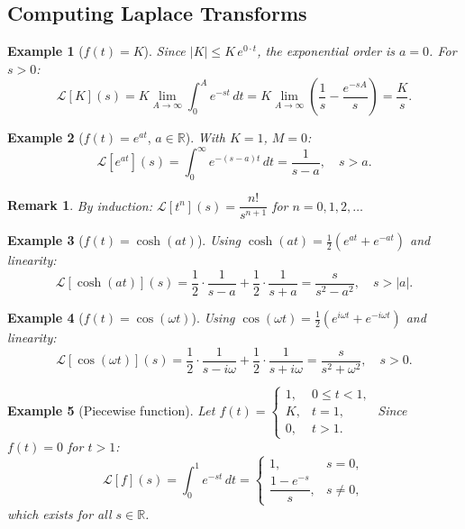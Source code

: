 \documentclass{article}
\newtheorem*{example}{Example}
\newtheorem{remark}{Remark}
\newcommand{\Lap}{\mathcal{L}}
\newcommand{\R}{\mathbb{R}}
\begin{document}
\subsection{Computing Laplace Transforms}

\begin{example}[$f(t) = K$]
    Since $|K| \leq K\,e^{0\cdot t}$, the exponential order is $a = 0$. For $s > 0$:
    \[\Lap[K](s) = K\lim_{A\to\infty}\int_0^A e^{-st}\,dt = K\lim_{A\to\infty}\left(\frac{1}{s} - \frac{e^{-sA}}{s}\right) = \frac{K}{s}.\]
\end{example}

\begin{example}[$f(t) = e^{at}$, $a\in\R$]
    With $K = 1$, $M = 0$:
    \[\Lap[e^{at}](s) = \int_0^\infty e^{-(s-a)t}\,dt = \frac{1}{s-a},\quad s > a.\]
\end{example}

\begin{remark}
    By induction: $\Lap[t^n](s) = \dfrac{n!}{s^{n+1}}$ for $n = 0,1,2,\ldots$
\end{remark}

\begin{example}[$f(t) = \cosh(at)$]
    Using $\cosh(at) = \frac{1}{2}(e^{at} + e^{-at})$ and linearity:
    \[\Lap[\cosh(at)](s) = \frac{1}{2}\cdot\frac{1}{s-a} + \frac{1}{2}\cdot\frac{1}{s+a} = \frac{s}{s^2 - a^2},\quad s > |a|.\]
\end{example}

\begin{example}[$f(t) = \cos(\omega t)$]
    Using $\cos(\omega t) = \frac{1}{2}(e^{i\omega t} + e^{-i\omega t})$ and linearity:
    \[\Lap[\cos(\omega t)](s) = \frac{1}{2}\cdot\frac{1}{s - i\omega} + \frac{1}{2}\cdot\frac{1}{s + i\omega} = \frac{s}{s^2 + \omega^2},\quad s > 0.\]
\end{example}

\begin{example}[Piecewise function]
    Let $f(t) = \begin{cases}1,& 0\leq t < 1,\\ K,& t = 1,\\ 0,& t > 1.\end{cases}$
    Since $f(t) = 0$ for $t > 1$:
    \[\Lap[f](s) = \int_0^1 e^{-st}\,dt = \begin{cases}1, & s = 0,\\[4pt] \dfrac{1 - e^{-s}}{s}, & s \neq 0,\end{cases}\]
    which exists for all $s\in\R$.
\end{example}
\end{document}
